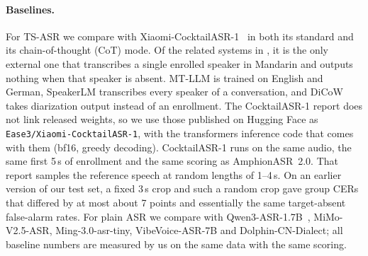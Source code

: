 \paragraph{Baselines.}
For TS-ASR we compare with Xiaomi-CocktailASR-1~\cite{zhang2026xiaomi} in both its standard and its chain-of-thought (CoT) mode.
Of the related systems in , it is the only external one that transcribes a single enrolled speaker in Mandarin and outputs nothing when that speaker is absent.
MT-LLM is trained on English and German, SpeakerLM transcribes every speaker of a conversation, and DiCoW takes diarization output instead of an enrollment.
The CocktailASR-1 report does not link released weights, so we use those published on Hugging Face as \texttt{Ease3/Xiaomi-CocktailASR-1}, with the transformers inference code that comes with them (bf16, greedy decoding).
CocktailASR-1 runs on the same audio, the same first 5\,s of enrollment and the same scoring as AmphionASR~2.0.
That report samples the reference speech at random lengths of 1--4\,s.
On an earlier version of our test set, a fixed 3\,s crop and such a random crop gave group CERs that differed by at most about 7 points and essentially the same target-absent false-alarm rates.
For plain ASR we compare with Qwen3-ASR-1.7B~\cite{shi2026qwen3asr}, MiMo-V2.5-ASR, Ming-3.0-asr-tiny, VibeVoice-ASR-7B and Dolphin-CN-Dialect; all baseline numbers are measured by us on the same data with the same scoring.

